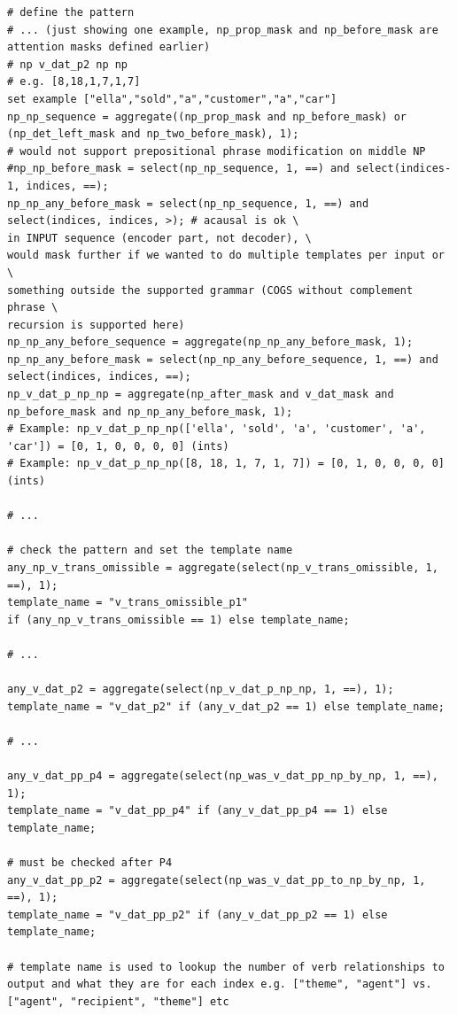 \documentclass[11pt]{article}
\begin{document}
\begin{tiny}
\begin{verbatim}
# define the pattern
# ... (just showing one example, np_prop_mask and np_before_mask are attention masks defined earlier)
# np v_dat_p2 np np
# e.g. [8,18,1,7,1,7]
set example ["ella","sold","a","customer","a","car"]
np_np_sequence = aggregate((np_prop_mask and np_before_mask) or (np_det_left_mask and np_two_before_mask), 1);
# would not support prepositional phrase modification on middle NP
#np_np_before_mask = select(np_np_sequence, 1, ==) and select(indices-1, indices, ==);
np_np_any_before_mask = select(np_np_sequence, 1, ==) and select(indices, indices, >); # acausal is ok \
in INPUT sequence (encoder part, not decoder), \
would mask further if we wanted to do multiple templates per input or \
something outside the supported grammar (COGS without complement phrase \
recursion is supported here)
np_np_any_before_sequence = aggregate(np_np_any_before_mask, 1);
np_np_any_before_mask = select(np_np_any_before_sequence, 1, ==) and select(indices, indices, ==);
np_v_dat_p_np_np = aggregate(np_after_mask and v_dat_mask and np_before_mask and np_np_any_before_mask, 1);
# Example: np_v_dat_p_np_np(['ella', 'sold', 'a', 'customer', 'a', 'car']) = [0, 1, 0, 0, 0, 0] (ints)
# Example: np_v_dat_p_np_np([8, 18, 1, 7, 1, 7]) = [0, 1, 0, 0, 0, 0] (ints)

# ...

# check the pattern and set the template name
any_np_v_trans_omissible = aggregate(select(np_v_trans_omissible, 1, ==), 1);
template_name = "v_trans_omissible_p1" 
if (any_np_v_trans_omissible == 1) else template_name;

# ...

any_v_dat_p2 = aggregate(select(np_v_dat_p_np_np, 1, ==), 1);
template_name = "v_dat_p2" if (any_v_dat_p2 == 1) else template_name;

# ...

any_v_dat_pp_p4 = aggregate(select(np_was_v_dat_pp_np_by_np, 1, ==), 1);
template_name = "v_dat_pp_p4" if (any_v_dat_pp_p4 == 1) else template_name;

# must be checked after P4
any_v_dat_pp_p2 = aggregate(select(np_was_v_dat_pp_to_np_by_np, 1, ==), 1);
template_name = "v_dat_pp_p2" if (any_v_dat_pp_p2 == 1) else template_name;

# template name is used to lookup the number of verb relationships to output and what they are for each index e.g. ["theme", "agent"] vs. ["agent", "recipient", "theme"] etc
\end{verbatim}
\end{tiny}
\clearpage
\end{document}
